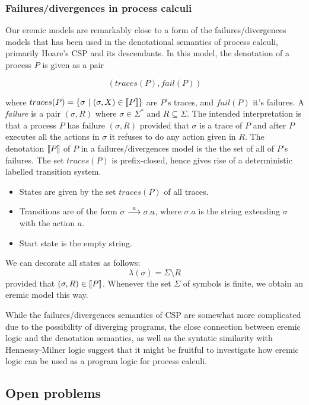 \subsubsection{Failures/divergences in process calculi}

Our eremic models are remarkably close to a form of the
failures/divergences models that has been used in the denotational
semantics of process calculi, primarily Hoare's CSP
\cite{HoareC:comseq,RoscoeAW:theapoc} and its descendants.  In this
model, the denotation of a process $P$ is given as a pair

\[
   (traces(P), fail(P))
\]

where $traces(P) = \{ \sigma\ |\ (\sigma, X) \in \lbrack\!\lbrack P \rbrack\!\rbrack \}$ are
$P$'s traces, and $fail(P)$ it's failures.  A \emph{failure} is a pair
$(\sigma, R)$ where $\sigma \in \Sigma^*$ and $R \subseteq
\Sigma$. The intended interpretation is that a process $P$ has failure
$(\sigma, R)$ provided that $\sigma$ is a trace of $P$ and after $P$
executes all the actions in $\sigma$ it refuses to do any action given
in $R$. The denotation $\lbrack\!\lbrack P \rbrack\!\rbrack$ of $P$ in a failures/divergences
model is the the set of all of $P$'s failures. The set $ traces(P)$ is
prefix-closed, hence gives rise of a deterministic labelled transition
system.
\begin{itemize}

\item States are given by the set $traces(P)$ of all traces.

\item Transitions are of the form $\sigma \stackrel{a}{\longrightarrow} \sigma.a$, where
  $\sigma.a$ is the string extending $\sigma$ with the action $a$.

\item Start state is the empty string.

\end{itemize}
We can decorate all states as follows:
\[
   \lambda (\sigma) = \Sigma \setminus R
\]
provided that $(\sigma, R) \in \lbrack\!\lbrack P \rbrack\!\rbrack$.  Whenever the set $\Sigma$
of symbols is finite, we obtain an eremic model this way.

While the failures/divergences semantics of CSP are somewhat more
complicated due to the possibility of diverging programs, the close
connection between eremic logic and the denotation semantics, as well
as the syntatic similarity with Hennessy-Milner logic suggest that it
might be fruitful to investigate how eremic logic can be used as a
program logic for process calculi.

\subsection{Open problems} 

